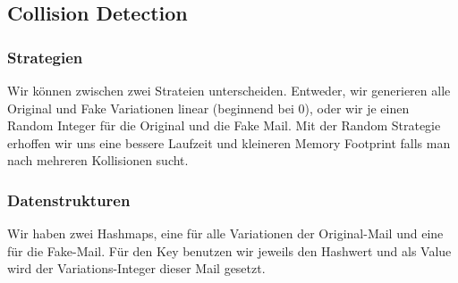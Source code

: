 \documentclass[12pt]{scrartcl}
\begin{document}
\subsection{Collision Detection}
\subsubsection{Strategien}
Wir können zwischen zwei Strateien unterscheiden. Entweder, wir generieren alle Original und Fake Variationen linear (beginnend bei 0), oder wir je einen Random Integer für die Original und die Fake Mail. Mit der Random Strategie erhoffen wir uns eine bessere Laufzeit und kleineren Memory Footprint falls man nach mehreren Kollisionen sucht.

\subsubsection{Datenstrukturen}
Wir haben zwei Hashmaps, eine für alle Variationen der Original-Mail und eine für die Fake-Mail. Für den Key benutzen wir jeweils den Hashwert und als Value wird der Variations-Integer dieser Mail gesetzt.
 
\end{document}
